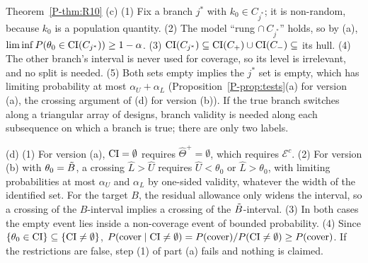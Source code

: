 \begin{proofof}{Theorem~\ref{P-thm:R10}}
(c) (1) Fix a branch $j^*$ with $k_0\in C_{j^*}$; it is non-random, because $k_0$ is a
population quantity. (2) The model ``rung $\cap\,C_{j^*}$'' holds, so by (a),
$\liminf P(\theta_0\in\mathrm{CI}(C_{j^*}))\ge1-\alpha$. (3)
$\mathrm{CI}(C_{j^*})\subseteq\mathrm{CI}(C_+)\cup\mathrm{CI}(C_-)\subseteq$ its hull. (4) The other branch's
interval is never used for coverage, so its level is irrelevant, and no split is
needed. (5) Both sets empty implies the $j^*$ set is empty, which has limiting
probability at most $\alpha_U+\alpha_L$ (Proposition~\ref{P-prop:tests}(a) for version (a),
the crossing argument of (d) for version (b)). If the true branch switches along a
triangular array of designs, branch validity is needed along each subsequence on which
a branch is true; there are only two labels.

(d) (1) For version (a), $\mathrm{CI}=\emptyset$ requires $\hat\Theta^+=\emptyset$, which requires
$\mathcal E^c$. (2) For version (b) with $\theta_0=\tilde B$, a crossing $\hat L>\hat U$ requires
$\hat U<\theta_0$ or $\hat L>\theta_0$, with limiting probabilities at most $\alpha_U$ and
$\alpha_L$ by one-sided validity, whatever the width of the identified set. For the
target $B$, the residual allowance only widens the interval, so a crossing of the
$B$-interval implies a crossing of the $\tilde B$-interval. (3) In both cases the empty event
lies inside a non-coverage event of bounded probability. (4) Since
$\{\theta_0\in\mathrm{CI}\}\subseteq\{\mathrm{CI}\ne\emptyset\}$,
$P(\text{cover}\mid\mathrm{CI}\ne\emptyset)=P(\text{cover})/P(\mathrm{CI}\ne\emptyset)\ge P(\text{cover})$. If the
restrictions are false, step (1) of part (a) fails and nothing is claimed.


\end{proofof}
